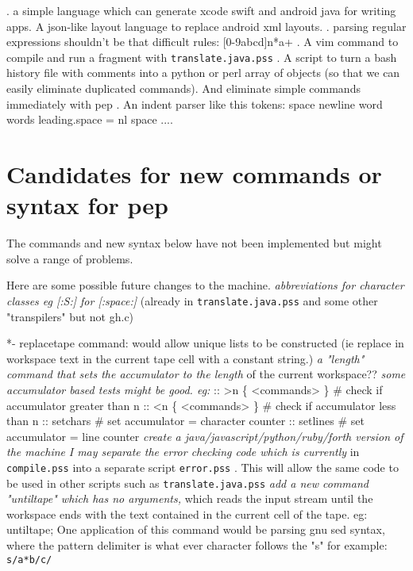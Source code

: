 \documentclass[a4paper,12pt]{article}
\begin{document}
  . a simple language which can generate xcode swift and android
    java for writing apps. A json-like layout language to replace
    android xml layouts.
  . parsing regular expressions shouldn't be that difficult
    rules:
      [0-9abcd]n*a+
  . A vim command to compile and run a fragment with \texttt{translate.java.pss}
  . A script to turn a bash history file with comments into
    a python or perl array of objects (so that we can easily
    eliminate duplicated commands). And eliminate simple commands
    immediately with pep
  . An indent parser like this
    tokens: space newline word words
    leading.space = nl space ....

\section{Candidates for new commands or syntax for pep}

  The commands and new syntax below have not been implemented
  but might solve a range of problems.

  Here are some possible future changes to the machine.
 \emph{ abbreviations for character classes eg [:S:] for [:space:] }
    (already in \texttt{translate.java.pss} and some other "transpilers"
    but not gh.c)

  *- replacetape command: would allow unique lists to be
     constructed (ie replace in workspace text in the current tape cell
     with a constant string.)
 \emph{ a "length" command that sets the accumulator to the length }
    of the current workspace??
 \emph{ some accumulator based tests might be good. eg: }
    :: >n \{ <commands> \} \# check if accumulator greater than n
    :: <n \{ <commands> \} \# check if accumulator less than n
    :: setchars \# set accumulator = character counter
    :: setlines \# set accumulator = line counter
 \emph{ create a java/javascript/python/ruby/forth version of the machine }
 \emph{ I may separate the error checking code which is currently }
    in \texttt{compile.pss} into a separate script \texttt{error.pss} . This will
    allow the same code to be used in other scripts such as
    \texttt{translate.java.pss}
 \emph{ add a new command "untiltape" which has no arguments, }
    which reads the input stream until the workspace ends with
    the text contained in the current cell of the tape.
       eg: untiltape;
    One application of this command would be parsing gnu sed
    syntax, where the pattern delimiter is what ever character
    follows the "s" for example: 
 \verb| s/a*b/c/ |
 
\end{document}
